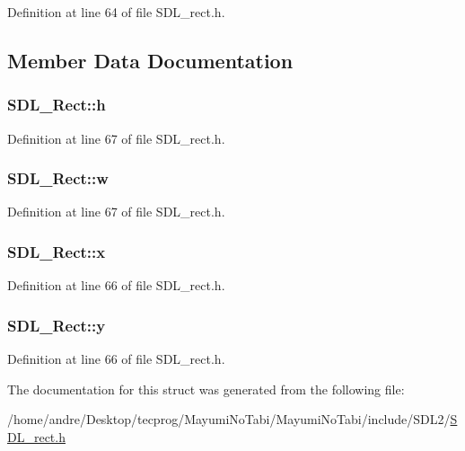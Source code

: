 Definition at line 64 of file S\-D\-L\-\_\-rect.\-h.



\subsection{Member Data Documentation}
\hypertarget{struct_s_d_l___rect_a0a17d46b320af8063b746153348edd72}{
\subsubsection[{h}]{ S\-D\-L\-\_\-\-Rect\-::h}}\label{struct_s_d_l___rect_a0a17d46b320af8063b746153348edd72}


Definition at line 67 of file S\-D\-L\-\_\-rect.\-h.

\hypertarget{struct_s_d_l___rect_a56b7be5738fb6fab86881534a814c45e}{
\subsubsection[{w}]{ S\-D\-L\-\_\-\-Rect\-::w}}\label{struct_s_d_l___rect_a56b7be5738fb6fab86881534a814c45e}


Definition at line 67 of file S\-D\-L\-\_\-rect.\-h.

\hypertarget{struct_s_d_l___rect_a85418d94621dd6855805c4b5c7bf6482}{
\subsubsection[{x}]{ S\-D\-L\-\_\-\-Rect\-::x}}\label{struct_s_d_l___rect_a85418d94621dd6855805c4b5c7bf6482}


Definition at line 66 of file S\-D\-L\-\_\-rect.\-h.

\hypertarget{struct_s_d_l___rect_a822694af8ddca5fd0d5d94e47106ab85}{
\subsubsection[{y}]{ S\-D\-L\-\_\-\-Rect\-::y}}\label{struct_s_d_l___rect_a822694af8ddca5fd0d5d94e47106ab85}


Definition at line 66 of file S\-D\-L\-\_\-rect.\-h.



The documentation for this struct was generated from the following file\-:\begin{DoxyCompactItemize}
\item 
/home/andre/\-Desktop/tecprog/\-Mayumi\-No\-Tabi/\-Mayumi\-No\-Tabi/include/\-S\-D\-L2/\hyperlink{_s_d_l__rect_8h}{S\-D\-L\-\_\-rect.\-h}\end{DoxyCompactItemize}
